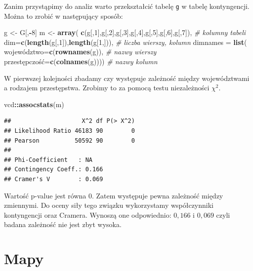 \documentclass[polish,]{book}
\newenvironment{Shaded}{\begin{snugshade}}{\end{snugshade}}
\newcommand{\CommentTok}[1]{\textcolor[rgb]{0.56,0.35,0.01}{\textit{#1}}}
\newcommand{\DataTypeTok}[1]{\textcolor[rgb]{0.13,0.29,0.53}{#1}}
\newcommand{\DecValTok}[1]{\textcolor[rgb]{0.00,0.00,0.81}{#1}}
\newcommand{\KeywordTok}[1]{\textcolor[rgb]{0.13,0.29,0.53}{\textbf{#1}}}
\newcommand{\NormalTok}[1]{#1}
\newcommand{\OperatorTok}[1]{\textcolor[rgb]{0.81,0.36,0.00}{\textbf{#1}}}
\newcommand{\StringTok}[1]{\textcolor[rgb]{0.31,0.60,0.02}{#1}}
\begin{document}
Zanim przystąpimy do analiz warto przekształcić tabelę \texttt{g} w tabelę kontyngencji.
Można to zrobić w następujący sposób:

\begin{Shaded}
\begin{Highlighting}[]
\NormalTok{g <-}\StringTok{ }\NormalTok{G[,}\OperatorTok{-}\DecValTok{8}\NormalTok{]}
\NormalTok{m <-}\StringTok{ }\KeywordTok{array}\NormalTok{(}
  \KeywordTok{c}\NormalTok{(g[,}\DecValTok{1}\NormalTok{],g[,}\DecValTok{2}\NormalTok{],g[,}\DecValTok{3}\NormalTok{],g[,}\DecValTok{4}\NormalTok{],g[,}\DecValTok{5}\NormalTok{],g[,}\DecValTok{6}\NormalTok{],g[,}\DecValTok{7}\NormalTok{]), }\CommentTok{# kolumny tabeli}
  \DataTypeTok{dim=}\KeywordTok{c}\NormalTok{(}\KeywordTok{length}\NormalTok{(g[,}\DecValTok{1}\NormalTok{]),}\KeywordTok{length}\NormalTok{(g[}\DecValTok{1}\NormalTok{,])),           }\CommentTok{# liczba wierszy, kolumn}
  \DataTypeTok{dimnames =} \KeywordTok{list}\NormalTok{(}
\NormalTok{    województwo=}\KeywordTok{c}\NormalTok{(}\KeywordTok{rownames}\NormalTok{(g)),    }\CommentTok{# nazwy wierszy}
\NormalTok{    przestępczość=}\KeywordTok{c}\NormalTok{(}\KeywordTok{colnames}\NormalTok{(g)))) }\CommentTok{# nazwy kolumn}
\end{Highlighting}
\end{Shaded}

W pierwszej kolejności zbadamy czy występuje zależność między województwami a
rodzajem przestępstwa. Zrobimy to za pomocą testu niezależności \(\chi^2\).

\begin{Shaded}
\begin{Highlighting}[]
\NormalTok{vcd}\OperatorTok{::}\KeywordTok{assocstats}\NormalTok{(m)}
\end{Highlighting}
\end{Shaded}

\begin{verbatim}
##                    X^2 df P(> X^2)
## Likelihood Ratio 46183 90        0
## Pearson          50592 90        0
## 
## Phi-Coefficient   : NA 
## Contingency Coeff.: 0.166 
## Cramer's V        : 0.069
\end{verbatim}

Wartość p-value jest równa 0. Zatem występuje pewna zależność między zmiennymi.
Do oceny siły tego związku wykorzystamy współczynniki kontyngencji oraz Cramera.
Wynoszą one odpowiednio: \(0,166\) i \(0,069\) czyli badana zależność nie jest zbyt wysoka.

\hypertarget{part_12.2}{%
\section{Mapy}\label{part_12.2}}
\end{document}

